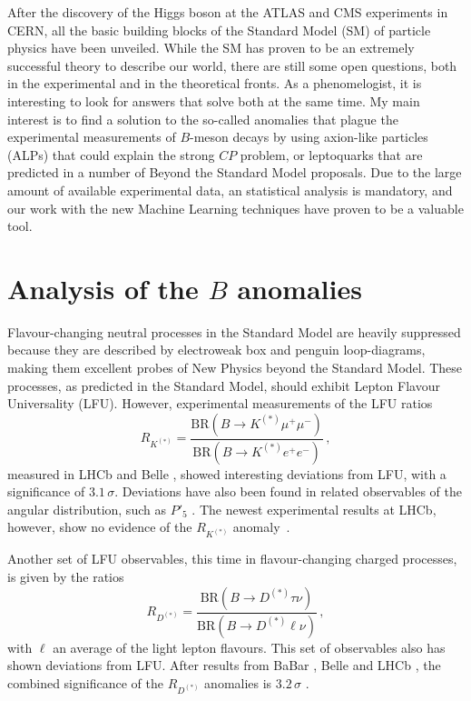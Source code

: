 \documentclass[combined.tex]{subfiles}
\begin{document}
After the discovery of the Higgs boson at the ATLAS and CMS experiments in CERN, all the basic building blocks of the Standard Model (SM) of particle physics have been unveiled. While the SM has proven to be an extremely successful theory to describe our world, there are still some open questions, both in the experimental and in the theoretical fronts. As a phenomelogist, it is interesting to look for answers that solve both at the same time. My main interest is to find a solution to the so-called anomalies that plague the experimental measurements of $B$-meson decays by using axion-like particles (ALPs) that could explain the strong $CP$ problem, or leptoquarks that are predicted in a number of Beyond the Standard Model proposals. Due to the large amount of available experimental data, an statistical analysis is mandatory, and our work with the new Machine Learning techniques have proven to be a valuable tool.



\section{Analysis of the $B$ anomalies}
Flavour-changing neutral processes in the Standard Model are heavily suppressed because they are described by electroweak box and penguin loop-diagrams, making them excellent probes of New Physics beyond the Standard Model. These processes, as predicted in the Standard Model, should exhibit Lepton Flavour Universality (LFU). However, experimental measurements of the LFU ratios
\begin{equation}
R_{K^{(*)}} = \frac{\mathrm{BR}(B\to K^{(*)}\mu^+ \mu^-)}{\mathrm{BR}(B\to K^{(*)}e^+ e^-)}\,,
\end{equation}
measured in LHCb \cite{LHCb:2014vgu,LHCb:2017avl,LHCb:2019hip,LHCb:2021trn,LHCb:2021lvy} and Belle \cite{Belle:2019oag,BELLE:2019xld}, showed interesting deviations from LFU, with a significance of $3.1\,\sigma$\cite{LHCb:2021trn}. Deviations have also been found in related observables of the angular distribution, such as $P'_5$ \cite{LHCb:2013ghj,LHCb:2014cxe,LHCb:2015svh,LHCb:2016ykl,LHCb:2020lmf,Belle:2016xuo,Belle:2016fev}. The newest experimental results at LHCb, however, show no evidence of the $R_{K^{(*)}}$ anomaly~\cite{LHCb:2022qnv,LHCb:2022zom}.

Another set of LFU observables, this time in flavour-changing charged processes, is given by the ratios
\begin{equation}
R_{D^{(*)}} = \frac{\mathrm{BR}(B\to D^{(*)} \tau \nu)}{\mathrm{BR}(B\to D^{(*)} \ell \nu)}\,,
\end{equation}
with $\ell$ an average of the light lepton flavours. This set of observables also has shown deviations from LFU. After results from BaBar \cite{BaBar:2012obs}, Belle \cite{Belle:2009xqm,Belle:2015qfa,Belle:2016dyj,Belle:2019gij} and LHCb \cite{LHCb:2015gmp,LHCb:2017smo,LHCb:2023zxo}, the combined significance of the $R_{D^{(*)}}$ anomalies is $3.2\,\sigma$ \cite{HFLAV:2019otj}.
\end{document}
